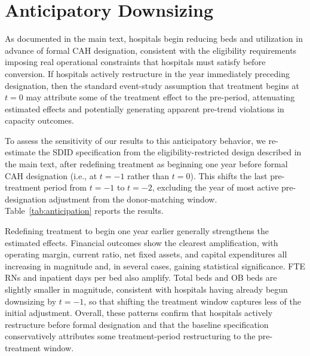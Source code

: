 \documentclass[a4paper, 12pt]{article}
\begin{document}

\section{Anticipatory Downsizing}
\label{sec:app-anticipation}

As documented in the main text, hospitals begin reducing beds and utilization in advance of formal CAH designation, consistent with the eligibility requirements imposing real operational constraints that hospitals must satisfy before conversion. If hospitals actively restructure in the year immediately preceding designation, then the standard event-study assumption that treatment begins at $t=0$ may attribute some of the treatment effect to the pre-period, attenuating estimated effects and potentially generating apparent pre-trend violations in capacity outcomes.

To assess the sensitivity of our results to this anticipatory behavior, we re-estimate the SDID specification from the eligibility-restricted design described in the main text, after redefining treatment as beginning one year before formal CAH designation (i.e., at $t=-1$ rather than $t=0$). This shifts the last pre-treatment period from $t=-1$ to $t=-2$, excluding the year of most active pre-designation adjustment from the donor-matching window. Table~\ref{tab:anticipation} reports the results.

Redefining treatment to begin one year earlier generally strengthens the estimated effects. Financial outcomes show the clearest amplification, with operating margin, current ratio, net fixed assets, and capital expenditures all increasing in magnitude and, in several cases, gaining statistical significance. FTE RNs and inpatient days per bed also amplify. Total beds and OB beds are slightly smaller in magnitude, consistent with hospitals having already begun downsizing by $t = -1$, so that shifting the treatment window captures less of the initial adjustment. Overall, these patterns confirm that hospitals actively restructure before formal designation and that the baseline specification conservatively attributes some treatment-period restructuring to the pre-treatment window.


\end{document}
